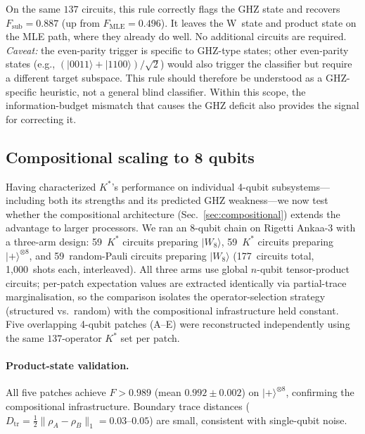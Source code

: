 \documentclass[twocolumn,prx,aps,superscriptaddress,longbibliography,floatfix]{revtex4-2}
\begin{document}
On the same $137$ circuits, this rule correctly flags the GHZ
state and recovers $F_{\mathrm{sub}} = 0.887$
(up from $F_{\mathrm{MLE}} = 0.496$).  It leaves the W~state
and product state on the MLE path, where they already do well.
No additional circuits are required.
\emph{Caveat:} the even-parity trigger is specific to GHZ-type
states; other even-parity states (e.g.,
$(|0011\rangle{+}|1100\rangle)/\sqrt{2}$) would also trigger
the classifier but require a different target subspace.
This rule should therefore be understood as a
GHZ-specific heuristic, not a general blind classifier.
Within this scope, the information-budget mismatch that causes
the GHZ deficit also provides the signal for correcting it.

\subsection{Compositional scaling to 8 qubits}
\label{sec:8qubit}

Having characterized $K^*$'s performance on individual 4-qubit
subsystems---including both its strengths and its predicted GHZ
weakness---we now test whether the compositional architecture
(Sec.~\ref{sec:compositional}) extends the advantage to larger
processors.
We ran an 8-qubit chain on Rigetti Ankaa-3 with a three-arm
design: 59~$K^*$ circuits preparing $|W_8\rangle$, 59~$K^*$
circuits preparing $|{+}\rangle^{\otimes 8}$, and 59~random-Pauli
circuits preparing $|W_8\rangle$ (177~circuits total,
1{,}000~shots each, interleaved).
All three arms use global $n$-qubit tensor-product circuits;
per-patch expectation values are extracted identically via
partial-trace marginalisation, so the comparison isolates
the operator-selection strategy (structured vs.\ random)
with the compositional infrastructure held constant.
Five overlapping 4-qubit patches (A--E) were reconstructed
independently using the same $137$-operator $K^*$ set per patch.

\paragraph{Product-state validation.}
All five patches achieve $F > 0.989$ (mean $0.992 \pm 0.002$)
on $|{+}\rangle^{\otimes 8}$, confirming the compositional
infrastructure.  Boundary trace distances
($D_{\mathrm{tr}} = \tfrac{1}{2}\|\rho_A - \rho_B\|_1 = 0.03$--$0.05$) are small, consistent with single-qubit
noise.
\end{document}
